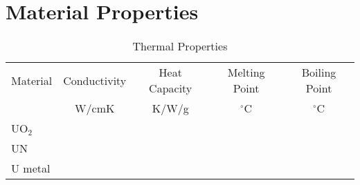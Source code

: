 \chapter*{Material Properties}


\begin{table}
  \centering
  \caption{Thermal Properties}
  \begin{tabular}{lcccc}
    \toprule  
    Material & Conductivity & Heat Capacity & Melting Point & Boiling Point\\
             & W/cmK &         K/W/g &        $^{\circ}$C  &   $^{\circ}$C \\
    \midrule    
    UO$_2$ & \\
    UN & \\
    U metal & \\
    \bottomrule
  \end{tabular}

\end{table}
